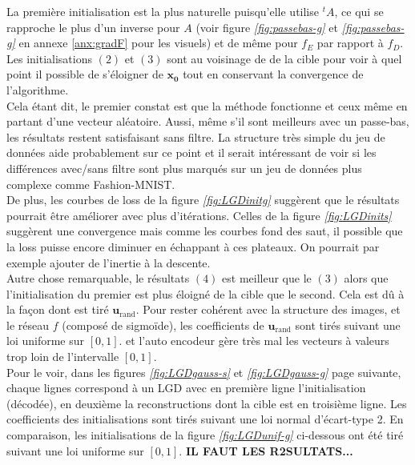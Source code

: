 \documentclass[hidelinks, french]{article} %
\renewcommand{\bf}[1]{\boldsymbol{#1}}
\theoremstyle{enonce}
\theoremstyle{special}
\theoremstyle{rq}
\theoremstyle{exo}
\theoremstyle{demo}
\begin{document}
\noindent La première initialisation est la plus naturelle puisqu'elle utilise $^tA$, ce qui se rapproche le plus d'un inverse pour $A$ (voir figure \textit{\ref{fig:passebas-g}} et \textit{\ref{fig:passebas-g}} en annexe \ref{anx:gradF} pour les visuels) et de même pour $f_E$ par rapport à $f_D$. 
\\
Les initialisations $(2)$ et $(3)$ sont au voisinage de de la cible  pour voir à quel point il possible de s'éloigner de $\bf{x_0}$ tout en conservant la convergence de l'algorithme.
\\

Cela étant dit, le premier constat est que la méthode fonctionne et ceux même en partant d'une vecteur aléatoire.  Aussi, même s'il sont meilleurs avec un passe-bas, les résultats restent satisfaisant sans filtre. La structure très simple du jeu de données aide probablement sur ce point et il serait intéressant de voir si les différences avec/sans filtre sont plus marqués sur un jeu de données plus complexe comme Fashion-MNIST.
\\
De plus, les courbes de loss de la figure \textit{\ref{fig:LGDinitg}} suggèrent que le résultats pourrait être améliorer avec plus d'itérations. Celles de la figure \textit{\ref{fig:LGDinits}} suggèrent une convergence mais comme  les courbes fond des saut, il possible que la loss puisse encore diminuer en échappant à ces plateaux. On pourrait par exemple ajouter de l'inertie à la descente.
\\
 
Autre chose remarquable, le résultats $(4)$ est meilleur que le $(3)$ alors que l'initialisation du premier est plus éloigné de la cible que le second. Cela est dû à la façon dont est tiré $\bf{u}_{\text{rand}}$. Pour rester cohérent avec la structure des images, et le réseau $f$ (composé de sigmoïde), les coefficients de $\bf{u}_{\text{rand}}$ sont tirés suivant une loi uniforme sur $[0,1]$. et l'auto encodeur gère très mal les vecteurs à valeurs trop loin de l'intervalle $[0,1]$. 
\\

Pour le voir, dans les figures \textit{\ref{fig:LGDgauss-s}} et \textit{\ref{fig:LGDgauss-g}} page suivante, chaque lignes correspond à un LGD avec en première ligne l'initialisation (décodée), en deuxième la reconstructions dont la cible est en troisième ligne. Les coefficients des initialisations sont tirés suivant une loi normal d'écart-type 2. En comparaison, les initialisations de la figure \textit{\ref{fig:LGDunif-g}} ci-dessous ont été tiré suivant une loi uniforme sur $[0,1]$. \textbf{\color{red}IL FAUT LES R2SULTATS...}
\end{document}
